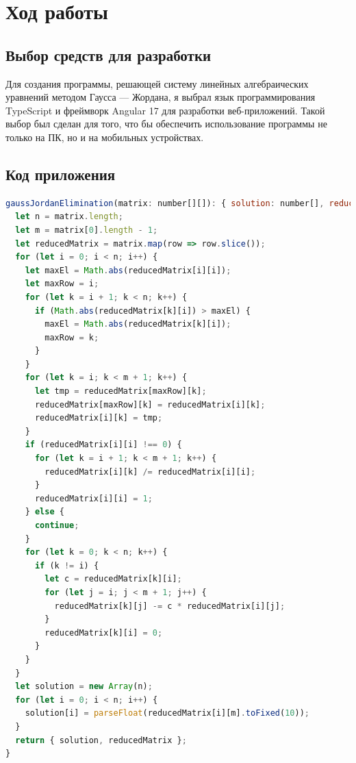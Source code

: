 \documentclass[12pt,a4paper]{scrartcl}
\begin{document}
\section{Ход работы}
    \subsection{Выбор средств для разработки}
    Для создания программы, решающей систему линейных алгебраических уравнений методом Гаусса — Жордана, я выбрал язык программирования TypeScript и фреймворк Angular 17 для разработки веб-приложений. Такой выбор был сделан для того, что бы обеспечить использование программы не только на ПК, но и на мобильных устройствах.
    \subsection{Код приложения} 
\begin{lstlisting}[language=JavaScript, caption=Gauss-Jordan Elimination Function]
gaussJordanElimination(matrix: number[][]): { solution: number[], reducedMatrix: number[][] } {
  let n = matrix.length;
  let m = matrix[0].length - 1;
  let reducedMatrix = matrix.map(row => row.slice());
  for (let i = 0; i < n; i++) {
    let maxEl = Math.abs(reducedMatrix[i][i]);
    let maxRow = i;
    for (let k = i + 1; k < n; k++) {
      if (Math.abs(reducedMatrix[k][i]) > maxEl) {
        maxEl = Math.abs(reducedMatrix[k][i]);
        maxRow = k;
      }
    }
    for (let k = i; k < m + 1; k++) {
      let tmp = reducedMatrix[maxRow][k];
      reducedMatrix[maxRow][k] = reducedMatrix[i][k];
      reducedMatrix[i][k] = tmp;
    }
    if (reducedMatrix[i][i] !== 0) {
      for (let k = i + 1; k < m + 1; k++) {
        reducedMatrix[i][k] /= reducedMatrix[i][i];
      }
      reducedMatrix[i][i] = 1;
    } else {
      continue;
    }
    for (let k = 0; k < n; k++) {
      if (k != i) {
        let c = reducedMatrix[k][i];
        for (let j = i; j < m + 1; j++) {
          reducedMatrix[k][j] -= c * reducedMatrix[i][j];
        }
        reducedMatrix[k][i] = 0;
      }
    }
  }
  let solution = new Array(n);
  for (let i = 0; i < n; i++) {
    solution[i] = parseFloat(reducedMatrix[i][m].toFixed(10));
  }
  return { solution, reducedMatrix };
}
\end{lstlisting}
\end{document}
